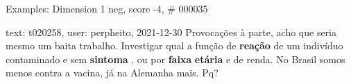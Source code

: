 \begin{frame}{Examples: Dimension 1 neg, score -4, \# 000035}
\footnotesize
\begin{alertblock}{text: t020258, user: perpheito, 2021-12-30}
Provocações à parte, acho que seria mesmo um baita trabalho. Investigar qual a 
função de \textbf{reação} de um indivíduo contaminado e sem \textbf{sintoma} , 
ou por \textbf{faixa} \textbf{etária} e de renda. No Brasil somos menos contra 
a vacina, já na Alemanha mais. Pq? 
\end{alertblock}
\end{frame}

